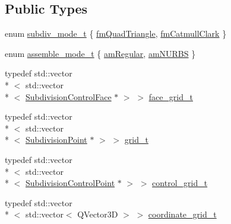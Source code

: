 \subsection*{Public Types}
\begin{DoxyCompactItemize}
\item 
enum \hyperlink{classShipCADGeometry_1_1SubdivisionSurface_a0006dff46f8a47b8b37746602c6c2eca}{subdiv\-\_\-mode\-\_\-t} \{ \hyperlink{classShipCADGeometry_1_1SubdivisionSurface_a0006dff46f8a47b8b37746602c6c2ecaa3c3f0d6cce29361e4fd13198ff983bf4}{fm\-Quad\-Triangle}, 
\hyperlink{classShipCADGeometry_1_1SubdivisionSurface_a0006dff46f8a47b8b37746602c6c2ecaaf9dcd0c858b2f4efa96b21c8bc143ed4}{fm\-Catmull\-Clark}
 \}
\item 
enum \hyperlink{classShipCADGeometry_1_1SubdivisionSurface_a43e2c7b57684c6741bfd80506a19c33e}{assemble\-\_\-mode\-\_\-t} \{ \hyperlink{classShipCADGeometry_1_1SubdivisionSurface_a43e2c7b57684c6741bfd80506a19c33ea9f09992ff41262cb0a59e197364be338}{am\-Regular}, 
\hyperlink{classShipCADGeometry_1_1SubdivisionSurface_a43e2c7b57684c6741bfd80506a19c33ea155f4b7859879ebff4b7dcd2c9aedaf4}{am\-N\-U\-R\-B\-S}
 \}
\item 
typedef std\-::vector\\*
$<$ std\-::vector\\*
$<$ \hyperlink{classShipCADGeometry_1_1SubdivisionControlFace}{Subdivision\-Control\-Face} $\ast$ $>$ $>$ \hyperlink{classShipCADGeometry_1_1SubdivisionSurface_a9059895d23b9715aac304d3fecca12fb}{face\-\_\-grid\-\_\-t}
\item 
typedef std\-::vector\\*
$<$ std\-::vector\\*
$<$ \hyperlink{classShipCADGeometry_1_1SubdivisionPoint}{Subdivision\-Point} $\ast$ $>$ $>$ \hyperlink{classShipCADGeometry_1_1SubdivisionSurface_a360ddace48a5d6827e99a21e78a6c458}{grid\-\_\-t}
\item 
typedef std\-::vector\\*
$<$ std\-::vector\\*
$<$ \hyperlink{classShipCADGeometry_1_1SubdivisionControlPoint}{Subdivision\-Control\-Point} $\ast$ $>$ $>$ \hyperlink{classShipCADGeometry_1_1SubdivisionSurface_a515bffd2b65080a2c7f07ce98f82b026}{control\-\_\-grid\-\_\-t}
\item 
typedef std\-::vector\\*
$<$ std\-::vector$<$ Q\-Vector3\-D $>$ $>$ \hyperlink{classShipCADGeometry_1_1SubdivisionSurface_a89a36532eb6c7c2022258f8605fe929c}{coordinate\-\_\-grid\-\_\-t}
\end{DoxyCompactItemize}
